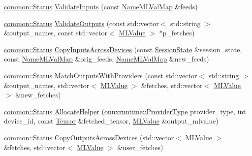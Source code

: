 \begin{DoxyCompactItemize}
\item 
\mbox{\hyperlink{classonnxruntime_1_1common_1_1Status}{common\+::\+Status}} \mbox{\hyperlink{classonnxruntime_1_1InferenceSession_1_1Impl_a5fda5b21f7ca7cb53ea657d886c2e176}{Validate\+Inputs}} (const \mbox{\hyperlink{namespaceonnxruntime_a48b01f0410ec8d693dbd40d1132bd66c}{Name\+M\+L\+Val\+Map}} \&feeds)
\item 
\mbox{\hyperlink{classonnxruntime_1_1common_1_1Status}{common\+::\+Status}} \mbox{\hyperlink{classonnxruntime_1_1InferenceSession_1_1Impl_a9974f44fa1a3bb57053edb9d6c89def5}{Validate\+Outputs}} (const std\+::vector$<$ std\+::string $>$ \&output\+\_\+names, const std\+::vector$<$ \mbox{\hyperlink{classonnxruntime_1_1MLValue}{M\+L\+Value}} $>$ $\ast$p\+\_\+fetches)
\item 
\mbox{\hyperlink{classonnxruntime_1_1common_1_1Status}{common\+::\+Status}} \mbox{\hyperlink{classonnxruntime_1_1InferenceSession_1_1Impl_ac681c08b076eb5cc3a97424b147e6a92}{Copy\+Inputs\+Across\+Devices}} (const \mbox{\hyperlink{classonnxruntime_1_1SessionState}{Session\+State}} \&session\+\_\+state, const \mbox{\hyperlink{namespaceonnxruntime_a48b01f0410ec8d693dbd40d1132bd66c}{Name\+M\+L\+Val\+Map}} \&orig\+\_\+feeds, \mbox{\hyperlink{namespaceonnxruntime_a48b01f0410ec8d693dbd40d1132bd66c}{Name\+M\+L\+Val\+Map}} \&new\+\_\+feeds)
\item 
\mbox{\hyperlink{classonnxruntime_1_1common_1_1Status}{common\+::\+Status}} \mbox{\hyperlink{classonnxruntime_1_1InferenceSession_1_1Impl_ab954418317f09f30ada88e64c750dbb8}{Match\+Outputs\+With\+Providers}} (const std\+::vector$<$ std\+::string $>$ \&output\+\_\+names, std\+::vector$<$ \mbox{\hyperlink{classonnxruntime_1_1MLValue}{M\+L\+Value}} $>$ \&fetches, std\+::vector$<$ \mbox{\hyperlink{classonnxruntime_1_1MLValue}{M\+L\+Value}} $>$ \&new\+\_\+fetches)
\item 
\mbox{\hyperlink{classonnxruntime_1_1common_1_1Status}{common\+::\+Status}} \mbox{\hyperlink{classonnxruntime_1_1InferenceSession_1_1Impl_ac9f294a90e67e3838589669752a772dd}{Allocate\+Helper}} (\mbox{\hyperlink{namespaceonnxruntime_a863e2227cbf32aab76aad35fdadff4bb}{onnxruntime\+::\+Provider\+Type}} provider\+\_\+type, int device\+\_\+id, const \mbox{\hyperlink{classonnxruntime_1_1Tensor}{Tensor}} \&fetched\+\_\+tensor, \mbox{\hyperlink{classonnxruntime_1_1MLValue}{M\+L\+Value}} \&output\+\_\+mlvalue)
\item 
\mbox{\hyperlink{classonnxruntime_1_1common_1_1Status}{common\+::\+Status}} \mbox{\hyperlink{classonnxruntime_1_1InferenceSession_1_1Impl_a186dd29be61d0703146263d87f1271f1}{Copy\+Outputs\+Across\+Devices}} (std\+::vector$<$ \mbox{\hyperlink{classonnxruntime_1_1MLValue}{M\+L\+Value}} $>$ \&fetches, std\+::vector$<$ \mbox{\hyperlink{classonnxruntime_1_1MLValue}{M\+L\+Value}} $>$ \&user\+\_\+fetches)

\end{DoxyCompactItemize}
